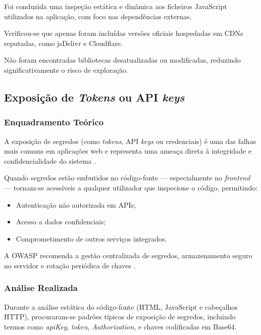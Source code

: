 Foi conduzida uma inspeção estática e dinâmica aos ficheiros JavaScript utilizados na aplicação, com foco nas dependências externas.

Verificou-se que apenas foram incluídas versões oficiais hospedadas em CDNs reputadas, como jsDelivr e Cloudflare.

Não foram encontradas bibliotecas desatualizadas ou modificadas, reduzindo significativamente o risco de exploração.

\subsection{Exposição de \textit{Tokens} ou API \textit{keys}}

\subsubsection{Enquadramento Teórico}

A exposição de segredos (como \textit{tokens}, API \textit{keys} ou credenciais) é uma das falhas mais comuns em aplicações web e representa uma ameaça direta à integridade e confidencialidade do sistema \cite{ref12}.

Quando segredos estão embutidos no código-fonte — especialmente no \textit{frontend} — tornam-se acessíveis a qualquer utilizador que inspecione o código, permitindo:

\begin{itemize}

\item Autenticação não autorizada em APIs;

\item Acesso a dados confidenciais;

\item Comprometimento de outros serviços integrados.

\end{itemize}

A OWASP recomenda a gestão centralizada de segredos, armazenamento seguro no servidor e rotação periódica de chaves \cite{ref13}.

\subsubsection{Análise Realizada}

Durante a análise estática do código-fonte (HTML, JavaScript e cabeçalhos HTTP), procuraram-se padrões típicos de exposição de segredos, incluindo termos como \textit{apiKey}, \textit{token}, \textit{Authorization}, e chaves codificadas em Base64.

